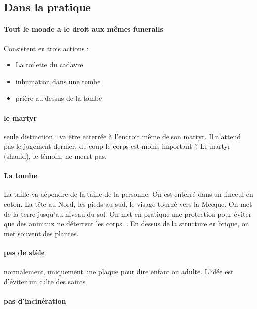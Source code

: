 \subsection{Dans la pratique}

\paragraph{Tout le monde a le droit aux mêmes funerails} Consistent en trois actions : 
\begin{itemize}
    \item La toilette du cadavre
    \item inhumation dans une tombe
    \item prière au dessus de la tombe
\end{itemize}

\paragraph{le martyr} seule distinction : va être enterrée à l'endroit même de son martyr. Il n'attend pas le jugement dernier, du coup le corps est moins important ? Le martyr (shaaid), le témoin, ne meurt pas. 

\paragraph{La tombe} La taille va dépendre de la taille de la personne. On est enterré dans un linceul en coton. La tête au Nord, les pieds au sud, le visage tourné vers la Mecque. On met de la terre jusqu'au niveau du sol. On met en pratique une protection pour éviter que des animaux ne déterrent les corps. .
En dessus de la structure en brique, on met souvent des plantes.


\paragraph{pas de stèle} normalement, uniquement une plaque pour dire enfant ou adulte. 
L'idée est d'éviter un culte des saints. 


\paragraph{pas d'incinération}

